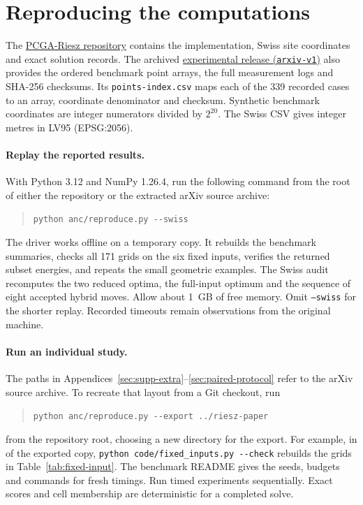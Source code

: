 \documentclass[a4paper,12pt]{article}
\numberwithin{equation}{section}
\begin{document}
\section{Reproducing the computations}\label{app:reproduce}
The \href{https://github.com/emmerichmtm/PCGA-Riesz}{PCGA-Riesz repository} contains the
implementation, Swiss site coordinates and exact solution records. The archived
\href{https://github.com/emmerichmtm/PCGA-Riesz/releases/tag/arxiv-v1}{experimental release
(\texttt{arxiv-v1})} also provides the ordered benchmark point arrays, the full measurement
logs and SHA-256 checksums. Its \texttt{points-index.csv} maps each of the 339 recorded
cases to an array, coordinate denominator and checksum. Synthetic benchmark coordinates are
integer numerators divided by $2^{20}$. The Swiss CSV gives integer metres in LV95 (EPSG:2056).

\paragraph{Replay the reported results.}
With Python 3.12 and NumPy 1.26.4, run the following command from the root of either the
repository or the extracted arXiv source archive:
\begin{quote}\verb|python anc/reproduce.py --swiss|\end{quote}
The driver works offline on a temporary copy. It rebuilds the benchmark summaries, checks
all 171 grids on the six fixed inputs, verifies the returned subset energies, and repeats the
small geometric examples. The Swiss audit recomputes the two reduced optima, the full-input
optimum and the sequence of eight accepted hybrid moves. Allow about 1~GB of free memory.
Omit \texttt{--swiss} for the shorter replay. Recorded timeouts remain observations from
the original machine.

\paragraph{Run an individual study.}
The paths in Appendices~\ref{sec:supp-extra}--\ref{sec:paired-protocol} refer to the
arXiv source archive. To recreate that layout from a Git checkout, run
\begin{quote}\verb|python anc/reproduce.py --export ../riesz-paper|\end{quote}
from the repository root, choosing a new directory for the export. For example, in
 of the exported copy, \verb|python code/fixed_inputs.py --check|
rebuilds the grids in Table~\ref{tab:fixed-input}. The benchmark README gives the seeds,
budgets and commands for fresh timings. Run timed experiments sequentially. Exact scores
and cell membership are deterministic for a completed solve.
\end{document}
